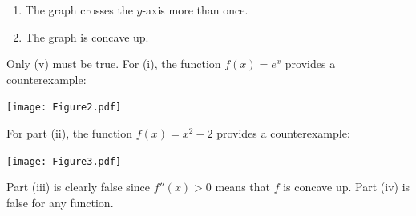 \documentclass[nooutcomes,handout]{ximera}
\begin{document}
\begin{problem}
\begin{enumerate}
\begin{enumerate}
         \item
           The graph crosses the $y$-axis more than once.

         \item
           The graph is concave up.
       \end{enumerate}
       \begin{freeResponse}
         Only (v) must be true.
         For (i), the function $f(x) = e^x$ provides a counterexample:
         \begin{image}
           \texttt{[image: Figure2.pdf]}
         \end{image}
			
         For part (ii), the function $f(x) = x^2 -2$ provides a counterexample:
         \begin{image}
           \texttt{[image: Figure3.pdf]}
         \end{image}
			
         Part (iii) is clearly false since $f''(x) > 0$ means that $f$ is concave up.
         Part (iv) is false for any function.
       \end{freeResponse}
    \end{enumerate}
\end{problem}
\end{document}
